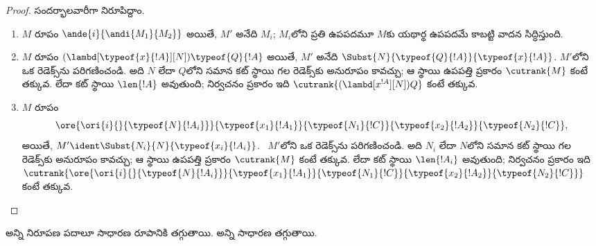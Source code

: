 \documentclass[../../../include/open-logic-section]{subfiles}
\begin{document}
\begin{proof}
  సందర్భాలవారీగా నిరూపిద్దాం.
  \begin{enumerate}
  \item $M$ రూపం $\ande{i}{\andi{M_1}{M_2}}$ అయితే, $M'$ అనేది $M_i$; $M_i$లోని ప్రతి ఉపపదమూ $M$కు యథార్థ ఉపపదమే కాబట్టి వాదన సిద్ధిస్తుంది.
  \item $M$ రూపం $(\lambd[\typeof{x}{!A}][N])\typeof{Q}{!A}$ అయితే, $M'$ అనేది $\Subst{N}{\typeof{Q}{!A}}{\typeof{x}{!A}}$. $M'$లోని ఒక రెడెక్స్‌ను పరిగణించండి. అది $N$ లేదా $Q$లోని సమాన కట్ స్థాయి గల రెడెక్స్‌కు అనురూపం కావచ్చు; ఆ స్థాయి ఉపపత్తి ప్రకారం $\cutrank{M}$ కంటే తక్కువ. లేదా కట్ స్థాయి $\len{!A}$ అవుతుంది; నిర్వచనం ప్రకారం ఇది $\cutrank{(\lambd[x^{!A}][N])Q}$ కంటే తక్కువ.
  \item $M$ రూపం
    \[
    \ore{\ori{i}{}{\typeof{N}{!A_i}}}
        {\typeof{x_1}{!A_1}}{\typeof{N_1}{!C}}
        {\typeof{x_2}{!A_2}}{\typeof{N_2}{!C}},
    \]
    అయితే, $M' \ident \Subst{N_i}{N}{\typeof{x_i}{!A_i}}$. ~$M'$లోని ఒక రెడెక్స్‌ను పరిగణించండి. అది $N_i$ లేదా $N$లోని సమాన కట్ స్థాయి గల రెడెక్స్‌కు అనురూపం కావచ్చు; ఆ స్థాయి ఉపపత్తి ప్రకారం $\cutrank{M}$ కంటే తక్కువ. లేదా కట్ స్థాయి $\len{!A_i}$ అవుతుంది; నిర్వచనం ప్రకారం ఇది $\cutrank{\ore{\ori{i}{}{\typeof{N}{!A_i}}}
      {\typeof{x_1}{!A_1}}{\typeof{N_1}{!C}}
      {\typeof{x_2}{!A_2}}{\typeof{N_2}{!C}}}$ కంటే తక్కువ.
  \end{enumerate}
\end{proof}

\begin{thm}
  అన్ని నిరూపణ పదాలూ సాధారణ రూపానికి తగ్గుతాయి. అన్ని  సాధారణ  తగ్గుతాయి.
\end{thm}
\end{document}
